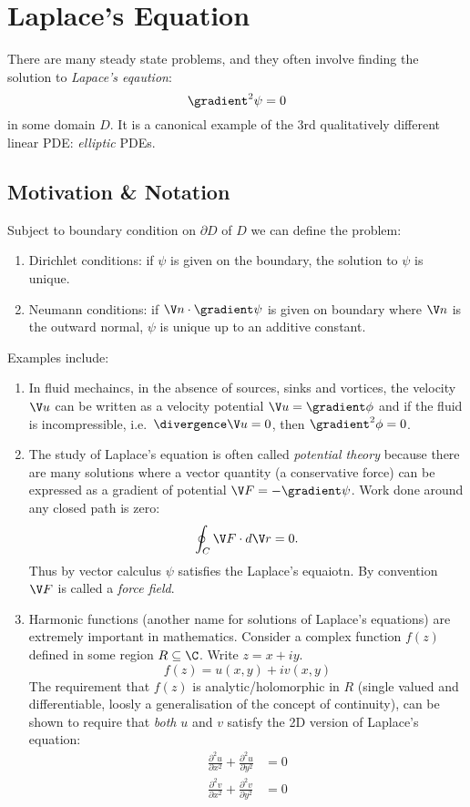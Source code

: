 \documentclass[a4paper]{article}
\newcommand*\grad{\gradient}
\newcommand*\dive{\divergence}
\newcommand*\laplace{\grad^2}
\newcommand*\lap{\laplace}
\begin{document}
\section{Laplace's Equation}

There are many steady state problems, and they often involve finding the solution to \emph{Lapace's eqaution}:
\[
  \lap \psi = 0
\]
in some domain \(D\). It is a canonical example of the \(3\)rd qualitatively different linear PDE: \emph{elliptic} PDEs.

\subsection{Motivation \& Notation}

Subject to boundary condition on \(\partial D\) of \(D\) we can define the problem:
\begin{enumerate}
\item Dirichlet conditions: if \(\psi\) is given on the boundary, the solution to \(\psi\) is unique.
\item Neumann conditions: if \(\V n \cdot \grad \psi\) is given on boundary where \(\V n\) is the outward normal, \(\psi\) is unique up to an additive constant.
\end{enumerate}

Examples include:
\begin{enumerate}
\item In fluid mechaincs, in the absence of sources, sinks and vortices, the velocity \(\V u\) can be written as a velocity potential \(\V u = \grad \phi\) and if the fluid is incompressible, i.e.\ \(\dive \V u = 0\), then \(\lap \phi = 0\).
\item The study of Laplace's equation is often called \emph{potential theory} because there are many solutions where a vector quantity (a conservative force) can be expressed as a gradient of potential \(\V F = -\grad \psi\). Work done around any closed path is zero:
  \[
    \oint_C \V F \cdot d\V r = 0.
  \]
  Thus by vector calculus \(\psi\) satisfies the Laplace's equaiotn. By convention \(\V F\) is called a \emph{force field}.
\item Harmonic functions (another name for solutions of Laplace's equations) are extremely important in mathematics. Consider a complex function \(f(z)\) defined in some region \(R \subseteq \C\). Write \(z = x + iy\).
\[
  f(z) = u(x, y) + iv(x, y)
\]
The requirement that \(f(z)\) is analytic/holomorphic in \(R\) (single valued and differentiable, loosly a generalisation of the concept of continuity), can be shown to require that \emph{both} \(u\) and \(v\) satisfy the 2D version of Laplace's equation:
\begin{align*}
  \frac{\partial^2 u}{\partial x^2} + \frac{\partial^2 u}{\partial y^2}  &= 0 \\
  \frac{\partial^2 v}{\partial x^2} + \frac{\partial^2 v}{\partial y^2}  &= 0
\end{align*}
\end{enumerate}
\end{document}
